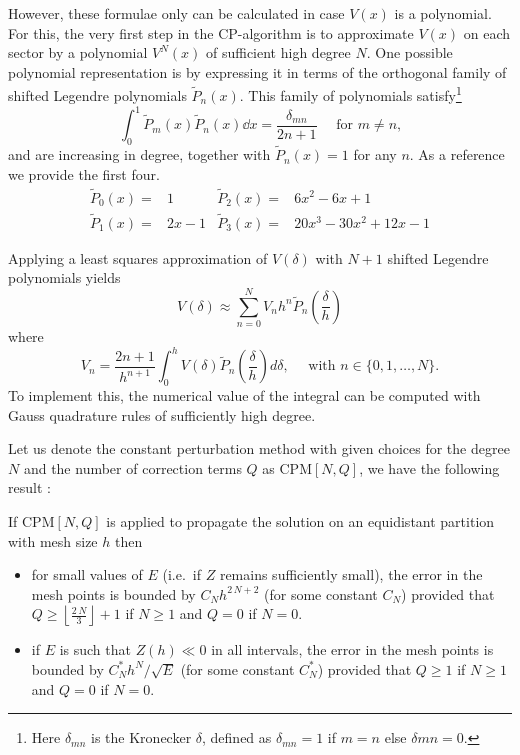 However, these formulae only can be calculated in case $V(x)$ is a polynomial. For this, the very first step in the CP-algorithm is to approximate $V(x)$ on each sector by a polynomial $V^{N}(x)$ of sufficient high degree $N$. One possible polynomial representation is by expressing it in terms of the orthogonal family of shifted Legendre polynomials $\widetilde{P}_n(x)$. This family of polynomials satisfy\footnote{Here $\delta_{mn}$ is the Kronecker $\delta$, defined as $\delta_{mn} = 1$ if $m=n$ else $\delta{mn} = 0$.}
$$
    \int_0^1 \widetilde{P}_m(x) \widetilde{P}_n(x) \dd x = \frac{\delta_{mn}}{2n + 1} \quad\text{ for $m \neq n$,}
$$
and are increasing in degree, together with $\widetilde{P}_n(x) = 1$ for any $n$. As a reference we provide the first four.
\begin{align*}
    \widetilde{P}_0(x) = & 1      & \widetilde{P}_2(x) = & 6x^2 - 6x + 1             \\
    \widetilde{P}_1(x) = & 2x - 1 & \widetilde{P}_3(x) = & 20 x^3 - 30 x^2 +12 x - 1
\end{align*}

Applying a least squares approximation of $V(\delta)$ with $N + 1$ shifted Legendre polynomials yields
$$
    V(\delta) \approx \sum_{n=0}^N V_n h^n \widetilde{P}_n\left(\frac{\delta}{h}\right)
$$
where
\begin{equation}\label{equ:c2_legendre_V}
    V_n= \frac{2 n + 1}{h^{n+1}} \int_0^h V(\delta) \widetilde{P}_n\left(\frac{\delta}{h}\right) d \delta, \quad \text{ with $n \in \{0, 1,\dots, N\}$.}
\end{equation}
To implement this, the numerical value of the integral can be computed with Gauss quadrature rules of sufficiently high degree.

Let us denote the constant perturbation method with given choices for the degree $N$ and the number of correction terms $Q$ as CPM$[N,Q]$, we have the following result \cite{ixaru_cp_1998}:

\begin{theorem}\label{the:c2_h_error_estimate}
    If $\text{CPM}[N,Q]$ is applied to propagate the solution on an equidistant partition with mesh size $h$ then
    \begin{itemize}
        \item for small values of $E$ (i.e.\ if $Z$ remains sufficiently small), the error in the mesh points is bounded by $C_N h^{2\,N+2}$ (for some constant $C_N$) provided that $Q \geq \left\lfloor \frac{2\,N}{3} \right\rfloor +1$ if $N \geq 1$ and $Q=0$ if $N=0$.
        \item if $E$ is such that $Z(h)\ll 0$ in all intervals, the error in the mesh points is bounded by $C^*_N h^{N}/ \sqrt{E}$  (for some constant $C^*_N$) provided that $Q \geq 1$  if $N \geq 1$ and $Q=0$ if $N=0$.
    \end{itemize}
\end{theorem}

